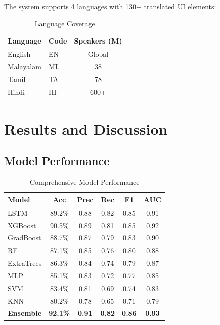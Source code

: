 \documentclass[journal,10pt,twoside]{IEEEtran}
\begin{document}
The system supports 4 languages with 130+ translated UI elements:

\begin{table}[h]
\centering
\caption{Language Coverage}
\begin{tabular}{|l|l|c|}
\hline
\textbf{Language} & \textbf{Code} & \textbf{Speakers (M)} \\
\hline
English & EN & Global \\
Malayalam & ML & 38 \\
Tamil & TA & 78 \\
Hindi & HI & 600+ \\
\hline
\end{tabular}
\end{table}

\section{Results and Discussion}

\subsection{Model Performance}

\begin{table}[h]
\centering
\caption{Comprehensive Model Performance}
\begin{tabular}{|l|c|c|c|c|c|}
\hline
\textbf{Model} & \textbf{Acc} & \textbf{Prec} & \textbf{Rec} & \textbf{F1} & \textbf{AUC} \\
\hline
LSTM & 89.2\% & 0.88 & 0.82 & 0.85 & 0.91 \\
XGBoost & 90.5\% & 0.89 & 0.81 & 0.85 & 0.92 \\
GradBoost & 88.7\% & 0.87 & 0.79 & 0.83 & 0.90 \\
RF & 87.1\% & 0.85 & 0.76 & 0.80 & 0.88 \\
ExtraTrees & 86.3\% & 0.84 & 0.74 & 0.79 & 0.87 \\
MLP & 85.1\% & 0.83 & 0.72 & 0.77 & 0.85 \\
SVM & 83.4\% & 0.81 & 0.69 & 0.74 & 0.83 \\
KNN & 80.2\% & 0.78 & 0.65 & 0.71 & 0.79 \\
\hline
\textbf{Ensemble} & \textbf{92.1\%} & \textbf{0.91} & \textbf{0.82} & \textbf{0.86} & \textbf{0.93} \\
\hline
\end{tabular}
\end{table}
\end{document}
